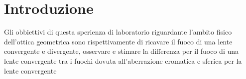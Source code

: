 \section{Introduzione}

Gli obbiettivi di questa sperienza di laboratorio riguardante l'ambito fisico dell'ottica geometrica sono rispettivamente di ricavare il fuoco di una lente convergente e divergente, osservare e stimare la differenza per il fuoco di una lente convergente tra i fuochi dovuta all'aberrazione cromatica e sferica per la lente convergente 

